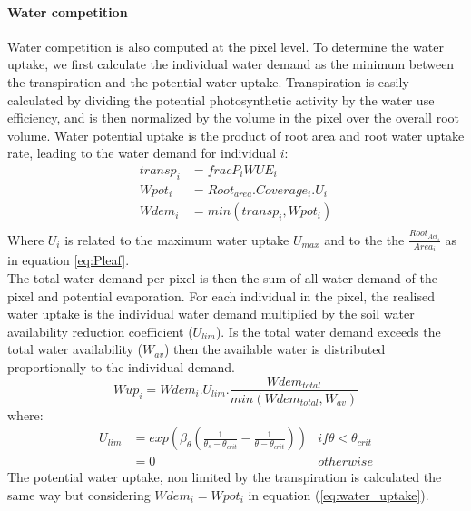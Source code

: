 \documentclass[a4paper,twoside, justified,marginals=raggedright]{tufte-handout}
\begin{document}
\paragraph{Water competition} Water competition is also computed at the pixel level. To determine the water uptake, we first calculate the individual water demand as the minimum between the transpiration and the potential water uptake. Transpiration is easily calculated by dividing the potential photosynthetic activity by the water use efficiency, and is then normalized by the volume in the pixel over the overall root volume. Water potential uptake is the product of root area and root water uptake rate, leading to the water demand for individual $i$:
\begin{align}
transp_{i} &= frac{P_{i}}{WUE_{i}}\\
Wpot_{i} &= Root_{area}.Coverage_{i}.U_{i}\\
Wdem_{i} &= min(transp_{i}, Wpot_{i})\\
\end{align}
Where $U_{i}$ is related to the maximum water uptake $U_{max}$ and to the the $\frac{Root_{Act_{i}}}{Area_{i}}$  as in equation \eqref{eq:Pleaf}.\\
The total water demand per pixel is then the sum of all water demand of the pixel and potential evaporation. For each individual in the pixel, the realised water uptake is the individual water demand multiplied by the soil water availability reduction coefficient ($U_{lim}$). Is the total water demand exceeds the total water availability ($W_{av}$) then the available water is distributed proportionally to the individual demand.\\
\begin{equation}\label{eq:water_uptake}
Wup_{i} = Wdem_{i} . U_{lim} . \frac{Wdem_{total}}{min(Wdem_{total}, W_{av})}
\end{equation}
where:
\begin{align}
U_{lim} &= exp\left(\beta_{\theta} \left( \frac{1}{\theta_{s} - \theta_{crit}} - \frac{1}{\theta - \theta_{crit}}\right)\right) & if \theta < \theta_{crit}\\
 &= 0 & otherwise
\end{align}
\indent The potential water uptake, non limited by the transpiration is calculated the same way but considering $Wdem_{i} = Wpot_{i}$ in equation (\ref{eq:water_uptake}).
\end{document}
